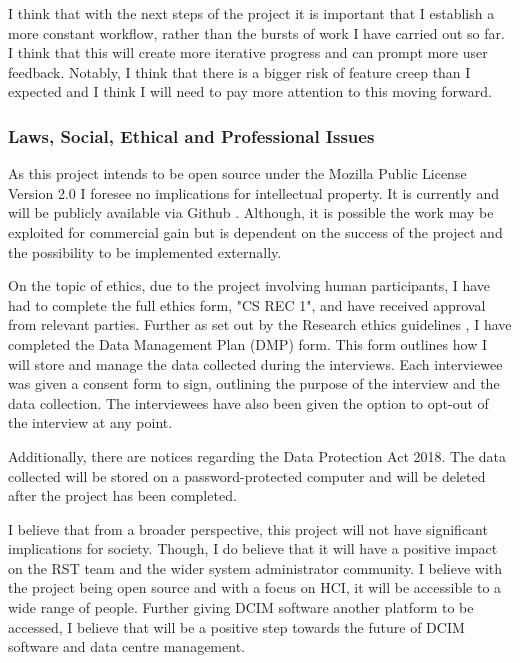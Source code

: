 \documentclass [11pt,a4paper]{article}
\begin{document}
I think that with the next steps of the project it is important that I establish a more constant workflow, rather than the bursts of work I have carried out so far. I think that this will create more iterative progress and can prompt more user feedback. Notably, I think that there is a bigger risk of feature creep than I expected and I think I will need to pay more attention to this moving forward.

\subsubsection{Laws, Social, Ethical and Professional Issues}
\label{sec:computer_laws}
As this project intends to be open source under the Mozilla Public License Version 2.0 I foresee no implications for intellectual property. It is currently and will be publicly available via Github \cite{keeptrackgithub}. Although, it is possible the work may be exploited for commercial gain but is dependent on the success of the project and the possibility to be implemented externally.

On the topic of ethics, due to the project involving human participants, I have had to complete the full ethics form, "CS REC 1", and have received approval from relevant parties. Further as set out by the Research ethics guidelines \cite{ethicsguidelines}, I have completed the Data Management Plan (DMP) form. This form outlines how I will store and manage the data collected during the interviews. Each interviewee was given a consent form to sign, outlining the purpose of the interview and the data collection. The interviewees have also been given the option to opt-out of the interview at any point.

Additionally, there are notices regarding the Data Protection Act 2018. The data collected will be stored on a password-protected computer and will be deleted after the project has been completed.

I believe that from a broader perspective, this project will not have significant implications for society. Though, I do believe that it will have a positive impact on the RST team and the wider system administrator community. I believe with the project being open source and with a focus on HCI, it will be accessible to a wide range of people. Further giving DCIM software another platform to be accessed, I believe that will be a positive step towards the future of DCIM software and data centre management.

\pagebreak
\end{document}
